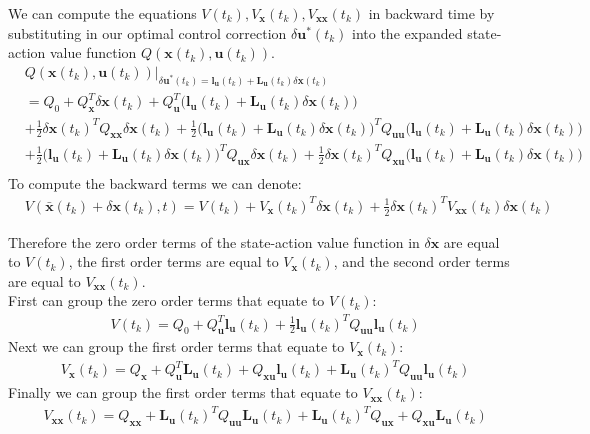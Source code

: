 \documentclass[11pt]{homework}
\renewcommand{\vec}[1]{\ensuremath{\boldsymbol{#1}}}
\begin{document}
\begin{arabicparts}
		\questionpart
	We can compute the equations $V(t_k), V_{\vec{x}}(t_k), V_{\vec{xx}}(t_k)$ in backward time by substituting in our optimal control correction $\delta\vec{u}^{*}(t_{k})$ into the expanded state-action value function $Q(\vec{x}(t_{k}), \vec{u}(t_{k}))$. 
			\begin{align*}
				& Q(\vec{x}(t_{k}), \vec{u}(t_{k}))\Big|_{\delta\vec{u}^{*}(t_{k}) = \vec{l}_{\vec{u}}(t_{k}) + \vec{L}_{\vec{u}}(t_{k})\delta\vec{x}(t_{k})} \\
				& =  Q_{0} + Q_{\vec{x}}^{T}\delta\vec{x}(t_{k}) + Q_{\vec{u}}^{T}\Big(\vec{l}_{\vec{u}}(t_{k}) + \vec{L}_{\vec{u}}(t_{k})\delta\vec{x}(t_{k})\Big) \\
				& + \frac{1}{2}\delta\vec{x}(t_{k})^{T}Q_{\vec{xx}}\delta\vec{x}(t_{k}) + \frac{1}{2}\Big(\vec{l}_{\vec{u}}(t_{k}) + \vec{L}_{\vec{u}}(t_{k})\delta\vec{x}(t_{k})\Big)^{T}Q_{\vec{uu}}\Big(\vec{l}_{\vec{u}}(t_{k}) + \vec{L}_{\vec{u}}(t_{k})\delta\vec{x}(t_{k})\Big) \\
				& + \frac{1}{2}\Big(\vec{l}_{\vec{u}}(t_{k}) + \vec{L}_{\vec{u}}(t_{k})\delta\vec{x}(t_{k})\Big)^{T}Q_{\vec{ux}}\delta\vec{x}(t_{k}) + \frac{1}{2}\delta\vec{x}(t_{k})^{T}Q_{\vec{xu}}\Big(\vec{l}_{\vec{u}}(t_{k}) + \vec{L}_{\vec{u}}(t_{k})\delta\vec{x}(t_{k})\Big) \\
			\end{align*}
		To compute the backward terms we can denote:
			\begin{align*}
				& V(\bar{\vec{x}}(t_{k}) + \delta\vec{x}(t_{k}),t) = V(t_k) + V_{\vec{x}}(t_{k})^T\delta\vec{x}(t_{k}) + \frac{1}{2}\delta\vec{x}(t_{k})^TV_{\vec{xx}}(t_{k})\delta\vec{x}(t_{k}) 
			\end{align*}

		Therefore the zero order terms of the state-action value function in $\delta\vec{x}$ are equal to $V(t_k)$, the first order terms are equal to $V_{\vec{x}}(t_{k})$, and the second order terms are equal to $V_{\vec{xx}}(t_{k})$. \\
	
		First can group the zero order terms that equate to $V(t_k)$: 
			\begin{align*}
				& V(t_k) = Q_{0} + Q_{\vec{u}}^{T}\vec{l}_{\vec{u}}(t_{k}) + \frac{1}{2}\vec{l}_{\vec{u}}(t_{k})^{T}Q_{\vec{uu}}\vec{l}_{\vec{u}}(t_{k})
			\end{align*}
		Next we can group the first order terms that equate to $V_{\vec{x}}(t_{k})$:
			\begin{align*}
				& V_{\vec{x}}(t_{k}) = Q_{\vec{x}} + Q_{\vec{u}}^{T}\vec{L}_{\vec{u}}(t_{k}) + Q_{\vec{xu}}\vec{l}_{\vec{u}}(t_{k}) + \vec{L}_{\vec{u}}(t_{k})^{T}Q_{\vec{uu}}\vec{l}_{\vec{u}}(t_{k}) 
			\end{align*}
		Finally we can group the first order terms that equate to $V_{\vec{xx}}(t_{k})$:
			\begin{align*}
				& V_{\vec{xx}}(t_{k}) = Q_{\vec{xx}} + \vec{L}_{\vec{u}}(t_{k})^{T}Q_{\vec{uu}}\vec{L}_{\vec{u}}(t_{k}) + \vec{L}_{\vec{u}}(t_{k})^{T}Q_{\vec{ux}} + Q_{\vec{xu}}\vec{L}_{\vec{u}}(t_{k}) 
			\end{align*}
	

\end{arabicparts}
\end{document}
